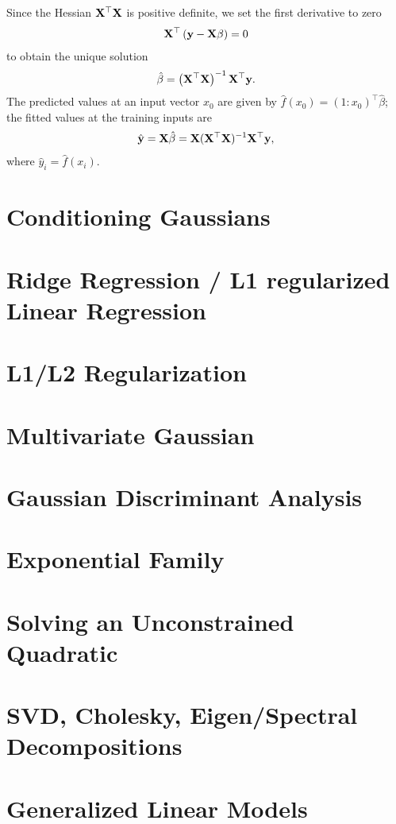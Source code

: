 \documentclass[info, crop, draft]{templates/Base}
\begin{document}
Since the Hessian ${\mathbf{X}}^\top {\mathbf{X}}$ is positive definite, we set the first derivative
to zero
\begin{gather}
  {\mathbf{X}}^\top \left( {\mathbf{y}} - {\mathbf{X}} \beta \right) = 0
\end{gather}
to obtain the unique solution
\begin{gather}
  \label{eq:beta_linear_regression}
  \hat{\beta} = \left( {\mathbf{X}}^\top {\mathbf{X}} \right)^{-1} {\mathbf{X}}^\top {\mathbf{y}}.
\end{gather}
The predicted values at an input vector $x_0$ are given by $\hat{f}(x_0) = (1 : x_0)^\top
\hat{\beta}$; the fitted values at the training inputs are
\begin{gather}
  \hat{{\mathbf{y}}} = {\mathbf{X}}\hat{\beta} = {\mathbf{X}}({\mathbf{X}}^\top {\mathbf{X}})^{-1}{\mathbf{X}}^\top {\mathbf{y}},
\end{gather}
where $\hat{y}_i = \hat{f}(x_i)$.

\section{Conditioning Gaussians}
\section{Ridge Regression / L1 regularized Linear Regression}
\section{L1/L2 Regularization}
\section{Multivariate Gaussian}
\section{Gaussian Discriminant Analysis}
\section{Exponential Family}
\section{Solving an Unconstrained Quadratic}
\section{SVD, Cholesky, Eigen/Spectral Decompositions}
\section{Generalized Linear Models}
\end{document}
